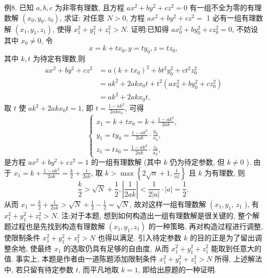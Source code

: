 例8. 已知 $a, b, c$ 为非零有理数, 且方程 $a x^2+b y^2+c z^2=0$ 有一组不全为零的有理数解 $\left(x_0, y_0, z_0\right)$, 求证: 对任意 $N>0$, 方程 $a x^2+b y^2+c z^2=$ 1 必有一组有理数解 $\left(x_1, y_1, z_1\right)$, 使得 $x_1^2+y_1^2+z_1^2>N$.
证明:已知得 $a x_0^2+b y_0^2+c z_0^2=0$, 不妨设其中 $x_0 \neq 0$, 令
$$
x=k+t x_0, y=t y_0, z=t z_0,
$$
其中 $k, t$ 为待定有理数,则
$$
\begin{aligned}
a x^2+b y^2+c z^2 & =a\left(k+t x_0\right)^2+b t^2 y_0^2+c t^2 z_0^2 \\
& =a k^2+2 a k x_0 t+t^2\left(a x_0^2+b y_0^2+c z_0^2\right) \\
& =a k^2+2 a k x_0 t,
\end{aligned}
$$
取 $t$ 使 $a k^2+2 a k x_0 t=1$, 即 $t=\frac{1-a k^2}{2 a k x_0}$, 可得
$$
\left\{\begin{array}{l}
x_1=k+t x_0=k+\frac{1-a k^2}{2 a k}, \\
y_1=t y_0=\frac{1-a k^2}{2 a k} \cdot \frac{y_0}{x_0}, \\
z_1=t z_0=\frac{1-a k^2}{2 a k} \cdot \frac{z_0}{x_0},
\end{array}\right.
$$
是方程 $a x^2+b y^2+c z^2=1$ 的一组有理数解 (其中 $k$ 仍为待定参数, 但 $k \neq 0$ ).
由于 $x_1=k+\frac{1-a k^2}{2 a k}=\frac{k}{2}+\frac{1}{2 a k}$, 取 $k>\max \left\{2 \sqrt{n}+1, \frac{1}{|a|}\right\}$ 且 $k$ 为有理数, 则
$$
\frac{k}{2}>\sqrt{N}+\frac{1}{2},\left|\frac{1}{2 a k}\right|<\frac{1}{2|a|} \cdot|a|=\frac{1}{2},
$$
从而 $x_1=\frac{k}{2}+\frac{1}{2 a k}>\sqrt{N}+\frac{1}{2}-\frac{1}{2}=\sqrt{N}$, 故对这样一组有理数解 $\left(x_1, y_1\right.$, $z_1$ ), 有 $x_1^2+y_1^2+z_1^2>N$.
注:对于本题, 想到如何构造出一组有理数解是很关键的, 整个解题过程也是先找到构造有理数解 $\left(x_1, y_1, z_1\right)$ 的一种策略, 再对构造过程进行调整, 使限制条件 $x_1^2+y_1^2+z_1^2>N$ 也得以满足.
引入待定参数 $k$ 的目的正是为了留出调整余地, 使最终 $x_1$ 的选取仍具有足够的自由度, 从而 $x_1^2+y_1^2+z_1^2$ 能取到任意大的值.
事实上, 本题是作者由一道陈题添加限制条件 $x_1^2+y_1^2+ z_1^2>N$ 所得, 上述解法中, 若只留有待定参数 $t$, 而平凡地取 $k=1$, 即给出原题的一种证明.



